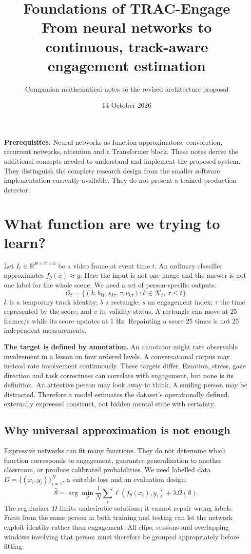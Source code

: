 \documentclass[10pt,a4paper]{article}
\title{Foundations of TRAC-Engage\\\large From neural networks to continuous, track-aware engagement estimation}
\author{Companion mathematical notes to the revised architecture proposal}
\date{14 October 2026}
\newcommand{\R}{\mathbb{R}}
\begin{document}
\maketitle
\vspace{-6mm}
\textbf{Prerequisites.} Neural networks as function approximators, convolution, recurrent networks, attention and a Transformer block. These notes derive the additional concepts needed to understand and implement the proposed system. They distinguish the complete research design from the smaller software implementation currently available. They do not present a trained production detector.

\section{What function are we trying to learn?}
Let $I_t\in\R^{H\times W\times3}$ be a video frame at event time $t$. An ordinary classifier approximates $f_\theta(x)\approx y$. Here the input is not one image and the answer is not one label for the whole scene. We need a set of person-specific outputs:
\begin{equation}
\mathcal O_t=\{(k,b_{kt},s_{k\tau},\tau,v_{k\tau}):k\in\mathcal K_t,\ \tau\leq t\}.
\end{equation}
$k$ is a temporary track identity; $b$ a rectangle; $s$ an engagement index; $\tau$ the time represented by the score; and $v$ its validity status. A rectangle can move at 25 frames/s while its score updates at 1 Hz. Repainting a score 25 times is not 25 independent measurements.

\textbf{The target is defined by annotation.} An annotator might rate observable involvement in a lesson on four ordered levels. A conversational corpus may instead rate involvement continuously. These targets differ. Emotion, stress, gaze direction and task correctness can correlate with engagement, but none is its definition. An attentive person may look away to think. A smiling person may be distracted. Therefore a model estimates the dataset's operationally defined, externally expressed construct, not hidden mental state with certainty.

\subsection{Why universal approximation is not enough}
Expressive networks can fit many functions. They do not determine which function corresponds to engagement, guarantee generalization to another classroom, or produce calibrated probabilities. We need labelled data $D=\{(x_i,y_i)\}_{i=1}^N$, a suitable loss and an evaluation design:
\begin{equation}
\hat\theta=\arg\min_\theta\frac1N\sum_i\ell(f_\theta(x_i),y_i)+\lambda\Omega(\theta).
\end{equation}
The regularizer $\Omega$ limits undesirable solutions; it cannot repair wrong labels. Faces from the same person in both training and testing can let the network exploit identity rather than engagement. All clips, sessions and overlapping windows involving that person must therefore be grouped appropriately before fitting.
\end{document}
